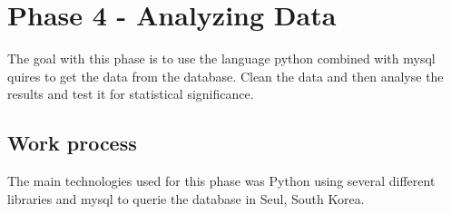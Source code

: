 
\chapter{Phase 4 - Analyzing Data} %

\label{Chapter7} %

The goal with this phase is to use the language python combined with mysql quires to get the data from the database. Clean the data and then analyse the results and test it for statistical significance.

\section{Work process}
The main technologies used for this phase was Python using several different libraries and mysql to querie the database in Seul, South Korea.

